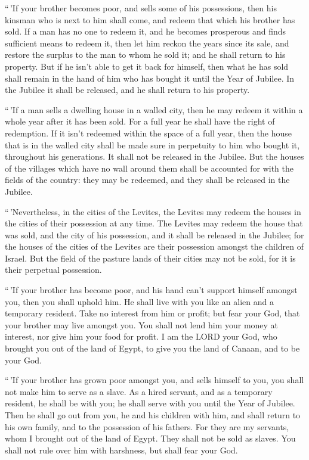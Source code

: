  ``\,'If your brother becomes poor, and sells some of his
possessions, then his kinsman who is next to him shall come, and redeem
that which his brother has sold.  If a man has no one to
redeem it, and he becomes prosperous and finds sufficient means to
redeem it,  then let him reckon the years since its sale,
and restore the surplus to the man to whom he sold it; and he shall
return to his property.  But if he isn't able to get it
back for himself, then what he has sold shall remain in the hand of him
who has bought it until the Year of Jubilee. In the Jubilee it shall be
released, and he shall return to his property.

 ``\,'If a man sells a dwelling house in a walled city,
then he may redeem it within a whole year after it has been sold. For a
full year he shall have the right of redemption.  If it
isn't redeemed within the space of a full year, then the house that is
in the walled city shall be made sure in perpetuity to him who bought
it, throughout his generations. It shall not be released in the Jubilee.
 But the houses of the villages which have no wall around
them shall be accounted for with the fields of the country: they may be
redeemed, and they shall be released in the Jubilee.

 ``\,'Nevertheless, in the cities of the Levites, the
Levites may redeem the houses in the cities of their possession at any
time.  The Levites may redeem the house that was sold, and
the city of his possession, and it shall be released in the Jubilee; for
the houses of the cities of the Levites are their possession amongst the
children of Israel.  But the field of the pasture lands of
their cities may not be sold, for it is their perpetual possession.

 ``\,'If your brother has become poor, and his hand can't
support himself amongst you, then you shall uphold him. He shall live
with you like an alien and a temporary resident.  Take no
interest from him or profit; but fear your God, that your brother may
live amongst you.  You shall not lend him your money at
interest, nor give him your food for profit.  I am the LORD
your God, who brought you out of the land of Egypt, to give you the land
of Canaan, and to be your God.

 ``\,'If your brother has grown poor amongst you, and sells
himself to you, you shall not make him to serve as a slave.
 As a hired servant, and as a temporary resident, he shall
be with you; he shall serve with you until the Year of Jubilee.
 Then he shall go out from you, he and his children with
him, and shall return to his own family, and to the possession of his
fathers.  For they are my servants, whom I brought out of
the land of Egypt. They shall not be sold as slaves.  You
shall not rule over him with harshness, but shall fear your God.

